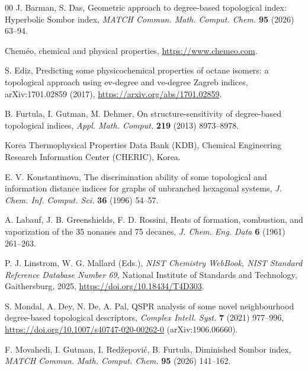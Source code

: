 \documentclass[a5paper, 10pt]{article}
\theoremstyle{plain}
\theoremstyle{remark}
\theoremstyle{definition}
\begin{document}
\singlespacing
\begin{thebibliography}{00}
   J. Barman, S. Das, Geometric approach to
  degree-based topological index: Hyperbolic Sombor index, \textit{MATCH
  Commun. Math. Comput. Chem.\/} \textbf{95} (2026) 63--94.

   Chem\'eo, chemical and physical properties,
  \url{https://www.chemeo.com}.

  S. Ediz, Predicting some physicochemical properties of octane isomers:
  a topological approach using ev-degree and ve-degree Zagreb indices,
  arXiv:1701.02859 (2017), \url{https://arxiv.org/abs/1701.02859}.

   B. Furtula, I. Gutman, M. Dehmer, On
  structure-sensitivity of degree-based topological indices, \textit{Appl.
  Math. Comput.\/} \textbf{219} (2013) 8973--8978.

   Korea Thermophysical Properties Data Bank (KDB), Chemical
  Engineering Research Information Center (CHERIC), Korea.

   E. V. Konstantinova, The
  discrimination ability of some topological and information distance indices
  for graphs of unbranched hexagonal systems, \textit{J. Chem. Inf. Comput.
  Sci.\/} \textbf{36} (1996) 54--57.

   A. Labauf, J. B. Greenshields,
  F. D. Rossini, Heats of formation, combustion, and vaporization of the
  35 nonanes and 75 decanes, \textit{J. Chem. Eng. Data\/} \textbf{6}
  (1961) 261--263.

   P. J. Linstrom, W. G. Mallard (Eds.), \textit{NIST
  Chemistry WebBook, NIST Standard Reference Database Number 69\/}, National
  Institute of Standards and Technology, Gaithersburg, 2025,
  \url{https://doi.org/10.18434/T4D303}.

  S. Mondal, A. Dey, N. De, A. Pal, QSPR analysis of some novel
  neighbourhood degree-based topological descriptors, \textit{Complex
  Intell. Syst.\/} \textbf{7} (2021) 977--996,
  \url{https://doi.org/10.1007/s40747-020-00262-0} (arXiv:1906.06660).

   F. Movahedi, I. Gutman, I.
  Red\v{z}epovi\'c, B. Furtula, Diminished Sombor index, \textit{MATCH Commun.
  Math. Comput. Chem.\/} \textbf{95} (2026) 141--162.


\end{thebibliography}
\end{document}
